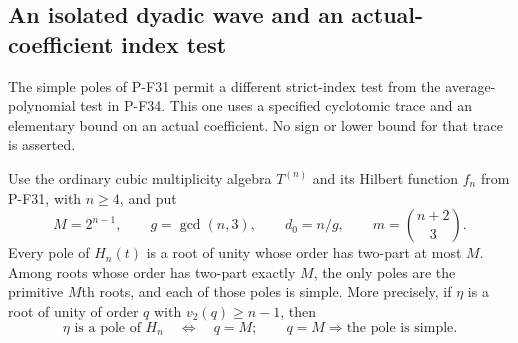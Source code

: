 \subsection{An isolated dyadic wave and an actual-coefficient index test}

The simple poles of P-F31 permit a different strict-index test from
the average-polynomial test in P-F34. This one uses a specified
cyclotomic trace and an elementary bound on an actual coefficient.
No sign or lower bound for that trace is asserted.

\begin{proposition}
\label{prop:cubicpairedwave}
Use the ordinary cubic multiplicity algebra $T^{(n)}$ and its
Hilbert function $f_n$ from P-F31, with $n\ge4$, and put
\[
 M=2^{n-1},\qquad g=\gcd(n,3),\qquad d_0=n/g,
 \qquad m=\binom{n+2}{3}.
\]
Every pole of $H_n(t)$ is a root of unity whose order has
two-part at most $M$. Among roots whose order has two-part exactly
$M$, the only poles are the primitive $M$th roots, and each of
those poles is simple. More precisely, if $\eta$ is a root of
unity of order $q$ with $v_2(q)\ge n-1$, then
\[
 \eta\text{ is a pole of }H_n
       \quad\Longleftrightarrow\quad q=M;
 \qquad q=M\Longrightarrow\text{the pole is simple}.
 \tag{P-F56a}
\]


\end{proposition}

